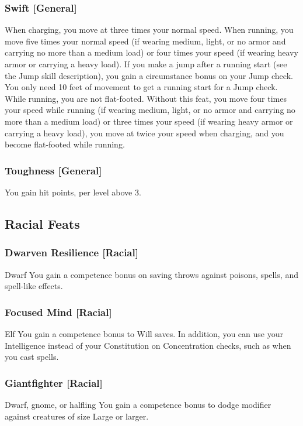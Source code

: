 \subsubsection{Swift [General]}
 When charging, you move at three times your normal speed. When running, you move five times your normal speed (if wearing medium, light, or no armor and carrying no more than a medium load) or four times your speed (if wearing heavy armor or carrying a heavy load).  If you make a jump after a running start (see the Jump skill description), you gain a  circumstance bonus on your Jump check. You only need 10 feet of movement to get a running start for a Jump check. While running, you are not flat-footed.
 Without this feat, you move four times your speed while running (if wearing medium, light, or no armor and carrying no more than a medium load) or three times your speed (if wearing heavy armor or carrying a heavy load), you move at twice your speed when charging, and you become flat-footed while running.

\subsubsection{Toughness [General]}
 You gain  hit points,  per level above 3.

\subsection{Racial Feats}

\subsubsection{Dwarven Resilience [Racial]}
 Dwarf
 You gain a  competence bonus on saving throws against poisons, spells, and spell-like effects.

\subsubsection{Focused Mind [Racial]}
 Elf
 You gain a  competence bonus to Will saves. In addition, you can use your Intelligence instead of your Constitution on Concentration checks, such as when you cast spells.

\subsubsection{Giantfighter [Racial]}
 Dwarf, gnome, or halfling
 You gain a  competence bonus to dodge modifier against creatures of size Large or larger.

